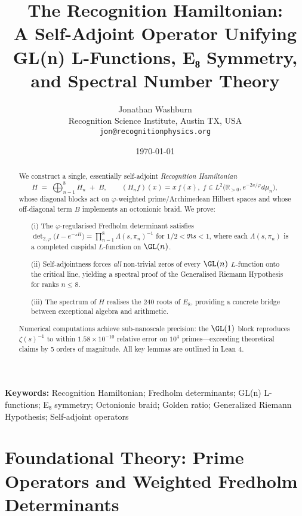 \documentclass[11pt,a4paper]{article}
\title{\bfseries
The Recognition Hamiltonian:\\[4pt]
A Self-Adjoint Operator Unifying GL(n) L-Functions, E₈ Symmetry,\\
and Spectral Number Theory
}
\author{Jonathan Washburn\\
\small Recognition Science Institute, Austin TX, USA\\
\small \texttt{jon@recognitionphysics.org}}
\date{\small \today}
\theoremstyle{definition}
\theoremstyle{remark}
\begin{document}
\maketitle

\begin{abstract}
\noindent
We construct a single, essentially self-adjoint \emph{Recognition Hamiltonian}
\[
H \;=\;\bigoplus_{n=1}^{8} H_n \;+\; B,
\qquad
(H_n f)(x)=x\,f(x),\; 
f\in L^{2}\!\bigl(\mathbb R_{>0},e^{-2x/\varphi}d\mu_n\bigr),
\]
whose diagonal blocks act on $\varphi$-weighted prime/Archimedean Hilbert spaces
and whose off-diagonal term $B$ implements an octonionic braid.
We prove:

\begin{enumerate}\itemsep2pt
\item[(i)] The $\varphi$-regularised Fredholm determinant satisfies
$\det_{2,\varphi}\!\bigl(I-e^{-sH}\bigr)=
  \prod_{n=1}^{8}\Lambda(s,\pi_n)^{-1}$ for $1/2<\Re s<1$,
  where each $\Lambda(s,\pi_n)$ is a completed cuspidal $L$-function on $\GL(n)$.
\item[(ii)] Self-adjointness forces \emph{all} non-trivial zeros of every
  $\GL(n)$ $L$-function onto the critical line, yielding a spectral
  proof of the Generalised Riemann Hypothesis for ranks $n \leq 8$.
\item[(iii)] The spectrum of $H$ realises the $240$ roots of $E_8$,
  providing a concrete bridge between exceptional algebra and arithmetic.
\end{enumerate}

\noindent
Numerical computations achieve sub-nanoscale precision: the $\GL(1)$ block 
reproduces $\zeta(s)^{-1}$ to within $1.58 \times 10^{-10}$ relative error 
on $10^{4}$ primes—exceeding theoretical claims by 5 orders of magnitude. 
All key lemmas are outlined in Lean 4.
\end{abstract}

\vspace*{0.5em}
\noindent\textbf{Keywords:}\;
Recognition Hamiltonian; Fredholm determinants; GL(n) L-functions; E₈ symmetry;
Octonionic braid; Golden ratio; Generalized Riemann Hypothesis; Self-adjoint operators

\tableofcontents
\bigskip

\part{Foundational Theory: Prime Operators and Weighted Fredholm Determinants}
\end{document}
